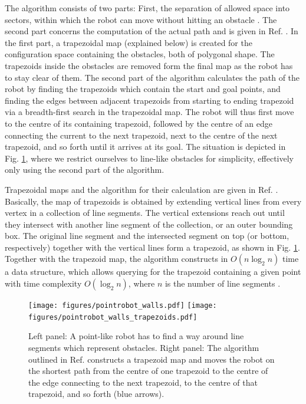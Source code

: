 The algorithm consists of two parts: First, the separation of allowed space into sectors, within which the robot can move 
without hitting an obstacle \cite[p. 286]{Berg2008}. 
The second part concerns the computation of the actual path and is given in Ref. \cite[p. 289]{Berg2008}. 
In the first part, a trapezoidal map (explained below) is created for the configuration space containing the obstacles, 
both of polygonal shape. The trapezoids inside the obstacles are removed form the final map as the robot has to stay clear 
of them. The second part of the algorithm calculates the path of the robot by finding the trapezoids which contain the start 
and goal points, and finding the edges between adjacent trapezoids from starting to ending trapezoid via a breadth-first search in the 
trapezoidal map. The robot will thus first move to the centre of its containing trapezoid, followed by the centre of an edge connecting 
the current to the next trapezoid, next to the centre of the next trapezoid, and so forth until it arrives at its goal. 
The situation is depicted in Fig. \ref{fig:robot_trapezoids}, where we restrict ourselves to line-like obstacles for simplicity, effectively
only using the second part of the algorithm.

Trapezoidal maps and the algorithm for their calculation are given in Ref. \cite[Ch. 6, pp. 121-146]{Berg2008}. Basically, the map of
trapezoids is obtained by extending vertical lines from every vertex in a collection of line segments. The vertical
extensions reach out until they intersect with another line segment of the collection, or an outer bounding box. The original line 
segment and the intersected segment on top (or bottom, respectively) together with the vertical lines form a trapezoid, as shown in 
Fig. \ref{fig:robot_trapezoids}. Together with the trapezoid map, the algorithm constructs in $O \left(n \log_{2} n \right)$ time a data 
structure, which allows querying for the trapezoid containing a given point with time complexity $O \left( \log_{2} n \right)$, 
where $n$ is the number of line segments \cite[Theorem 6.3, p. 133]{Berg2008}.

\begin{figure}[htb]
	\centering
	\texttt{[image: figures/pointrobot\_walls.pdf]}
	\hspace{1 cm}
	\texttt{[image: figures/pointrobot\_walls\_trapezoids.pdf]}
	\caption[Path-finding using trapezoid maps.]{
		Left panel: A point-like robot has to find a way around line segments which represent obstacles. Right panel: 
		The algorithm outlined in Ref. \cite[p. 289]{Berg2008} constructs a trapezoid map and moves the robot on the
		shortest path from the centre of one trapezoid to the centre of the edge connecting to the next trapezoid, to the
		centre of that trapezoid, and so forth (blue arrows).}
	\label{fig:robot_trapezoids}
\end{figure}

